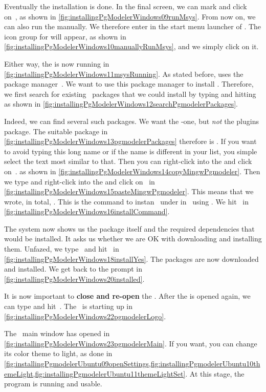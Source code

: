 Eventually the installation is done.
In the final screen, we can mark  and click on~, as shown in \cref{fig:installingPgModelerWindows09runMsys}.
From now on, we can also run the   manually.
We therefore enter  in the start menu launcher of \microsoftWindows.
The icon group for  will appear, as shown in \cref{fig:installingPgModelerWindows10manuallyRunMsys}, and we simply click on it.

Either way, the   is now running in \cref{fig:installingPgModelerWindows11msysRunning}.
As stated before,  uses the  package manager~\cite{VGL2002:P,TOSID2025L:COMPMS}.
We want to use this package manager to install \pgmodeler.
Therefore, we first search for existing \pgmodeler\ packages that we could install by typing  and hitting~\keys{\enter} as shown in \cref{fig:installingPgModelerWindows12searchPgmodelerPackages}.

Indeed, we can find several such packages.
We want the -one, but \emph{not} the plugins package.
The suitable package in \cref{fig:installingPgModelerWindows13pgmodelerPackages} therefore is .
If you want to avoid typing this long name or if the name is different in your list, you simple select the text most similar to that.
Then you can right-click into the  and click on~. as shown in  \cref{fig:installingPgModelerWindows14copyMingwPgmodeler}.
Then we type  and right-click into the  and click on~ in \cref{fig:installingPgModelerWindows15pasteMingwPgmodeler}.
This means that we wrote, in total, .
This is the command to instan \pgmodeler\ under  in \microsoftWindows\ using .
We hit~\keys{\enter} in \cref{fig:installingPgModelerWindows16installCommand}.

The system now shows us the package itself and the required dependencies that would be installed.
It asks us whether we are OK with downloading and installing them.
Unfazed, we type~ and hit~\keys{\enter} in \cref{fig:installingPgModelerWindows18installYes}.
The packages are now downloaded and installed.
We get back to the  prompt in \cref{fig:installingPgModelerWindows20installed}.

It is now important to \textbf{close and re-open} the  .
After the  is opened again, we can type  and hit~\keys{\enter}.
The \pgmodeler\ is starting up in \cref{fig:installingPgModelerWindows22pgmodelerLogo}.

The \pgmodeler\ main window has opened in \cref{fig:installingPgModelerWindows23pgmodelerMain}.
If you want, you can change its color theme to light, as done in \cref{fig:installingPgmodelerUbuntu09openSettings,fig:installingPgmodelerUbuntu10themeLight,fig:installingPgmodelerUbuntu11themeLightSet}.
At this stage, the program is running and usable.%
%
\FloatBarrier%
\endhsection%
%
